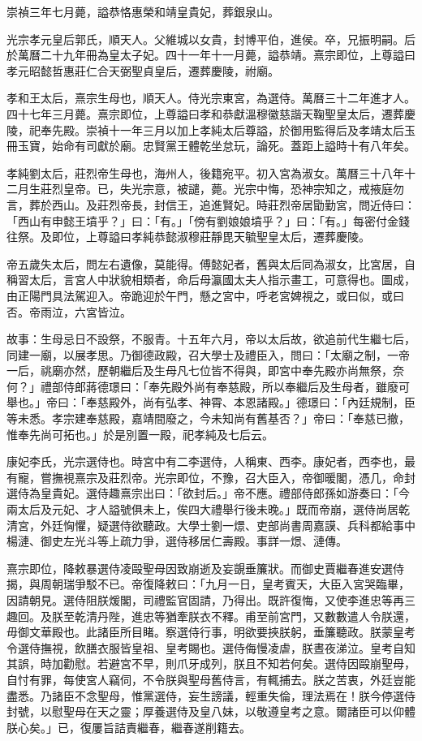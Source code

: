 崇禎三年七月薨，謚恭恪惠榮和靖皇貴妃，葬銀泉山。

光宗孝元皇后郭氏，順天人。父維城以女貴，封博平伯，進侯。卒，兄振明嗣。后於萬曆二十九年冊為皇太子妃。四十一年十一月薨，謚恭靖。熹宗即位，上尊謚曰孝元昭懿哲惠莊仁合天弼聖貞皇后，遷葬慶陵，祔廟。

孝和王太后，熹宗生母也，順天人。侍光宗東宮，為選侍。萬曆三十二年進才人。四十七年三月薨。熹宗即位，上尊謚曰孝和恭獻溫穆徽慈諧天鞠聖皇太后，遷葬慶陵，祀奉先殿。崇禎十一年三月以加上孝純太后尊謚，於御用監得后及孝靖太后玉冊玉寶，始命有司獻於廟。忠賢黨王體乾坐怠玩，論死。蓋距上謚時十有八年矣。

孝純劉太后，莊烈帝生母也，海州人，後籍宛平。初入宮為淑女。萬曆三十八年十二月生莊烈皇帝。已，失光宗意，被譴，薨。光宗中悔，恐神宗知之，戒掖庭勿言，葬於西山。及莊烈帝長，封信王，追進賢妃。時莊烈帝居勖勤宮，問近侍曰：「西山有申懿王墳乎？」曰：「有。」「傍有劉娘娘墳乎？」曰：「有。」每密付金錢往祭。及即位，上尊謚曰孝純恭懿淑穆莊靜毘天毓聖皇太后，遷葬慶陵。

帝五歲失太后，問左右遺像，莫能得。傅懿妃者，舊與太后同為淑女，比宮居，自稱習太后，言宮人中狀貌相類者，命后母瀛國太夫人指示畫工，可意得也。圖成，由正陽門具法駕迎入。帝跪迎於午門，懸之宮中，呼老宮婢視之，或曰似，或曰否。帝雨泣，六宮皆泣。

故事：生母忌日不設祭，不服青。十五年六月，帝以太后故，欲追前代生繼七后，同建一廟，以展孝思。乃御德政殿，召大學士及禮臣入，問曰：「太廟之制，一帝一后，祧廟亦然，歷朝繼后及生母凡七位皆不得與，即宮中奉先殿亦尚無祭，奈何？」禮部侍郎蔣德璟曰：「奉先殿外尚有奉慈殿，所以奉繼后及生母者，雖廢可舉也。」帝曰：「奉慈殿外，尚有弘孝、神霄、本恩諸殿。」德璟曰：「內廷規制，臣等未悉。孝宗建奉慈殿，嘉靖間廢之，今未知尚有舊基否？」帝曰：「奉慈已撤，惟奉先尚可拓也。」於是別置一殿，祀孝純及七后云。

康妃李氏，光宗選侍也。時宮中有二李選侍，人稱東、西李。康妃者，西李也，最有寵，嘗撫視熹宗及莊烈帝。光宗即位，不豫，召大臣入，帝御暖閣，憑几，命封選侍為皇貴妃。選侍趣熹宗出曰：「欲封后。」帝不應。禮部侍郎孫如游奏曰：「今兩太后及元妃、才人謚號俱未上，俟四大禮舉行後未晚。」既而帝崩，選侍尚居乾清宮，外廷恟懼，疑選侍欲聽政。大學士劉一燝、吏部尚書周嘉謨、兵科都給事中楊漣、御史左光斗等上疏力爭，選侍移居仁壽殿。事詳一燝、漣傳。

熹宗即位，降敕暴選侍凌毆聖母因致崩逝及妄覬垂簾狀。而御史賈繼春進安選侍揭，與周朝瑞爭駁不已。帝復降敕曰：「九月一日，皇考賓天，大臣入宮哭臨畢，因請朝見。選侍阻朕煖閣，司禮監官固請，乃得出。既許復悔，又使李進忠等再三趣回。及朕至乾清丹陛，進忠等猶牽朕衣不釋。甫至前宮門，又數數遣人令朕還，毋御文華殿也。此諸臣所目睹。察選侍行事，明欲要挾朕躬，垂簾聽政。朕蒙皇考令選侍撫視，飲膳衣服皆皇祖、皇考賜也。選侍侮慢凌虐，朕晝夜涕泣。皇考自知其誤，時加勸慰。若避宮不早，則爪牙成列，朕且不知若何矣。選侍因毆崩聖母，自忖有罪，每使宮人竊伺，不令朕與聖母舊侍言，有輒捕去。朕之苦衷，外廷豈能盡悉。乃諸臣不念聖母，惟黨選侍，妄生謗議，輕重失倫，理法焉在！朕今停選侍封號，以慰聖母在天之靈；厚養選侍及皇八妹，以敬遵皇考之意。爾諸臣可以仰體朕心矣。」已，復屢旨詰責繼春，繼春遂削籍去。

